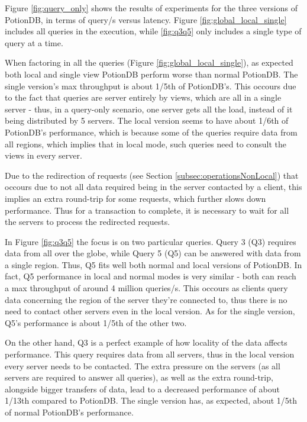 \documentclass{vldb}
\newcommand{\grumbler}[2]{{\color{red}{\bf #1:} #2}}
\renewcommand{\grumbler}[2]{}
\newcommand{\andre}[1]{\grumbler{andre}{#1}}
\begin{document}
Figure \ref{fig:query_only} shows the results of experiments for the three versions of PotionDB, in terms of query/s versus latency.
Figure \ref{fig:global_local_single} includes all queries in the execution, while \ref{fig:q3q5} only includes a single type of query at a time.

When factoring in all the queries (Figure \ref{fig:global_local_single}), as expected both local and single view PotionDB perform worse than normal PotionDB.
The single version's max throughput is about 1/5th of PotionDB's.
This occours due to the fact that queries are server entirely by views, which are all in a single server - thus, in a query-only scenario, one server gets all the load, instead of it being distributed by 5 servers.
The local version seems to have about 1/6th of PotionDB's performance, which is because some of the queries require data from all regions, which implies that in local mode, such queries need to consult the views in every server.
\andre{Note: the section describing redirected operations needs to be reviewed for sure.}
Due to the redirection of requests (see Section \ref{subsec:operationsNonLocal}) that occours due to not all data required being in the server contacted by a client, this implies an extra round-trip for some requests, which further slows down performance.
Thus for a transaction to complete, it is necessary to wait for all the servers to process the redirected requests.

In Figure \ref{fig:q3q5} the focus is on two particular queries. Query 3 (Q3) requires data from all over the globe, while Query 5 (Q5) can be answered with data from a single region.
Thus, Q5 fits well both normal and local versions of PotionDB.
In fact, Q5 performance in local and normal modes is very similar - both can reach a max throughput of around 4 million queries/s.
This occours as clients query data concerning the region of the server they're connected to, thus there is no need to contact other servers even in the local version.
As for the single version, Q5's performance is about 1/5th of the other two.
\andre{Note: I'm not sure I should say "locality of the data" here. Basically what I mean is that for queries which require a global view is where PotionDB shines.}
On the other hand, Q3 is a perfect example of how locality of the data affects performance.
This query requires data from all servers, thus in the local version every server needs to be contacted. The extra pressure on the servers (as all servers are required to answer all queries), as well as the extra round-trip, alongside bigger transfers of data, lead to a decreased performance of about 1/13th compared to PotionDB.
The single version has, as expected, about 1/5th of normal PotionDB's performance.
\end{document}

